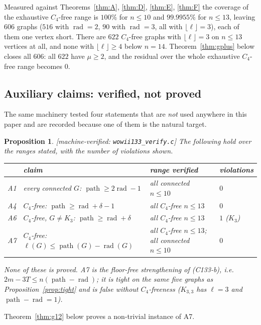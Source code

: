 \documentclass[11pt]{article}
\theoremstyle{plain}
\newtheorem{proposition}[theorem]{Proposition}
\theoremstyle{definition}
\theoremstyle{remark}
\numberwithin{equation}{section}
\newcommand{\rad}{\operatorname{rad}}
\newcommand{\pth}{\operatorname{path}}
\newcommand{\statusbox}[1]{{\small\sloppy\textsf{[#1]}}}
\newcommand{\MV}[1]{\statusbox{machine-verified: \texttt{#1}}}
\begin{document}
Measured against Theorems~\ref{thm:A}, \ref{thm:D}, \ref{thm:E}, \ref{thm:F} the coverage of
the exhaustive $C_4$-free range is $100\%$ for $n \le 10$ and $99.9955\%$ for $n \le 13$,
leaving $606$ graphs ($516$ with $\rad = 2$, $90$ with $\rad = 3$, all with
$\lfloor\ell\rfloor = 3$), each of them one vertex short. There are $622$ $C_4$-free graphs
with $\lfloor \ell\rfloor = 3$ on $n \le 13$ vertices at all, and none with
$\lfloor\ell\rfloor \ge 4$ below $n = 14$. Theorem~\ref{thm:gplus} below closes all $606$:
all $622$ have $\mu \ge 2$, and the residual over the whole exhaustive $C_4$-free range
becomes $0$.

\subsection{Auxiliary claims: verified, not proved}\label{sec:aux}

The same machinery tested four statements that are \emph{not} used anywhere in this paper and
are recorded because one of them is the natural target.

\begin{proposition}\label{prop:aux}
\MV{wowii133\_verify.c}
The following hold over the ranges stated, with the number of violations shown.
\begin{center}
\small
\begin{tabular}{@{}llll@{}}
\toprule
& claim & range verified & violations \\
\midrule
A1 & every connected $G$: $\pth \ge 2\rad - 1$ & all connected $n \le 10$ & $0$\\
A4 & $C_4$-free: $\pth \ge \rad + \delta - 1$ & all $C_4$-free $n \le 13$ & $0$\\
A6 & $C_4$-free, $G \ne K_3$: $\pth \ge \rad + \delta$ & all $C_4$-free $n \le 13$ &
   $1$ ($K_3$)\\
A7 & $C_4$-free: $\ell(G) \le \pth(G) - \rad(G)$ & all $C_4$-free $n \le 13$;
   all connected $n \le 10$ & $0$\\
\bottomrule
\end{tabular}
\end{center}
None of these is proved. A7 is the floor-free strengthening of (C133-b), i.e.\
$2m - 3T \le n(\pth - \rad)$; it is tight on the same five graphs as
Proposition~\ref{prop:tight} and is false without $C_4$-freeness ($K_{3,3}$ has $\ell = 3$
and $\pth - \rad = 1$).
\end{proposition}

Theorem~\ref{thm:g12} below proves a non-trivial instance of A7.
\end{document}
